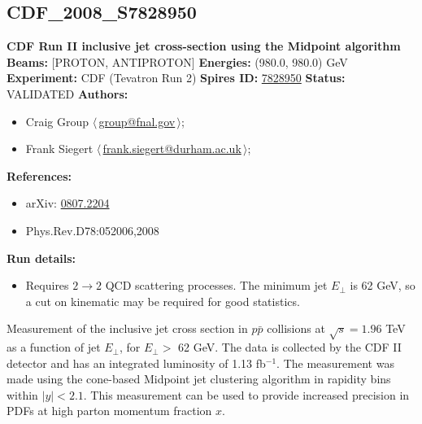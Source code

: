 \clearpage


\clearpage

\subsection[CDF\_2008\_S7828950]{CDF\_2008\_S7828950\,\cite{Aaltonen:2008eq}}
\textbf{CDF Run II inclusive jet cross-section using the Midpoint algorithm}\newline
\textbf{Beams:} [PROTON, ANTIPROTON] \newline
\textbf{Energies:} (980.0, 980.0) GeV \newline
\textbf{Experiment:} CDF (Tevatron Run 2) \newline
\textbf{Spires ID:} \href{http://www.slac.stanford.edu/spires/find/hep/www?rawcmd=key+7828950}{7828950}\newline
\textbf{Status:} VALIDATED\newline
\textbf{Authors:}
\begin{itemize}
  \item Craig Group $\langle\,$\href{mailto:group@fnal.gov}{group@fnal.gov}$\,\rangle$;
  \item Frank Siegert $\langle\,$\href{mailto:frank.siegert@durham.ac.uk}{frank.siegert@durham.ac.uk}$\,\rangle$;
\end{itemize}
\textbf{References:}
\begin{itemize}
  \item arXiv: \href{http://arxiv.org/abs/0807.2204}{0807.2204}
  \item Phys.Rev.D78:052006,2008
\end{itemize}
\textbf{Run details:}
\begin{itemize}

  \item Requires $2\rightarrow{2}$ QCD scattering processes. The minimum jet $E_\perp$ is 62 GeV, so a cut on kinematic \pTmin may be required for good statistics.\end{itemize}

\noindent Measurement of the inclusive jet cross section in $p\bar{p}$ collisions at $\sqrt{s}=1.96$ TeV as a function of jet $E_\perp$, for $E_\perp >$ 62 GeV. The data is collected by the CDF II detector and has an integrated luminosity of 1.13 fb$^{-1}$. The measurement was made using the cone-based Midpoint jet clustering algorithm in rapidity bins within $|y|<2.1$. This measurement can be used to provide increased precision in PDFs at high parton momentum fraction $x$.

